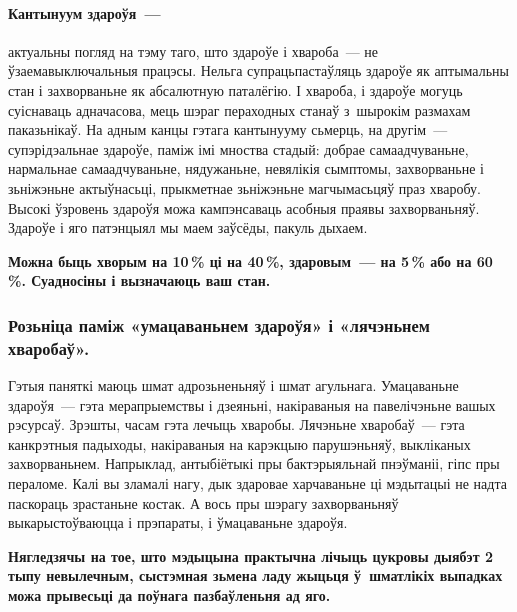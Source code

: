 \paragraph{Кантынуум здароўя~---} актуальны погляд на тэму таго, што здароўе і хвароба~--- не ўзаемавыключальныя працэсы. Нельга супрацьпастаўляць здароўе як аптымальны стан і захворваньне як абсалютную паталёгію. І хвароба, і здароўе могуць суіснаваць адначасова, мець шэраг пераходных станаў з~шырокім размахам паказьнікаў. На адным канцы гэтага кантынууму сьмерць, на другім~--- супэрідэальнае здароўе, паміж імі мноства стадый: добрае самаадчуваньне, нармальнае самаадчуваньне, нядужаньне, невялікія сымптомы, захворваньне і зьніжэньне актыўнасьці, прыкметнае зьніжэньне магчымасьцяў праз хваробу. Высокі ўзровень здароўя можа кампэнсаваць асобныя праявы захворваньняў. Здароўе і яго патэнцыял мы маем заўсёды, пакуль дыхаем. 

\textbf{Можна быць хворым на 10\,\% ці на 40\,\%, здаровым~--- на 5\,\% або на 60\,\%. Суадносіны і вызначаюць ваш стан.}

\subsubsection{Розьніца паміж «умацаваньнем здароўя» і «лячэньнем хваробаў».} 

Гэтыя паняткі маюць шмат адрозьненьняў і шмат агульнага. Умацаваньне здароўя~--- гэта мерапрыемствы і дзеяньні, накіраваныя на павелічэньне вашых рэсурсаў. Зрэшты, часам гэта лечыць хваробы. Лячэньне хваробаў~--- гэта канкрэтныя падыходы, накіраваныя на карэкцыю парушэньняў, выкліканых захворваньнем. Напрыклад, антыбіётыкі пры бактэрыяльнай пнэўманіі, гіпс пры пераломе. Калі вы зламалі нагу, дык здаровае харчаваньне ці мэдытацыі не надта паскораць зрастаньне костак. А вось пры шэрагу захворваньняў выкарыстоўваюцца і прэпараты, і ўмацаваньне здароўя.


\textbf{Нягледзячы на тое, што мэдыцына практычна лічыць цукровы дыябэт 2 тыпу невылечным, сыстэмная зьмена ладу жыцьця ў~шматлікіх выпадках можа прывесьці да поўнага пазбаўленьня ад яго.}



